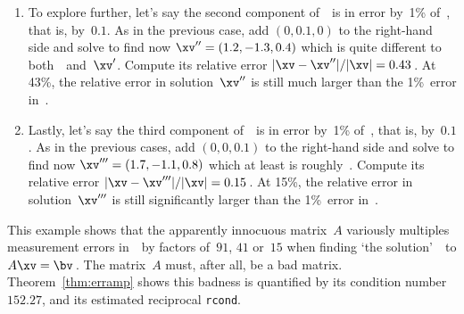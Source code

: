 \begin{example}
\begin{enumerate}
\item To explore further, let's say the second component of~\bv\ is in error by~1\% of~\bv, that is, by~\(0.1\).
As in the previous case, add \((0,0.1,0)\) to the right-hand side and solve to find now \(\xv''=(1.2,-1.3,0.4)\) which is quite different to both~\xv\ and~\(\xv'\).
Compute its relative error \(|\xv-\xv''|/|\xv|=0.43\)\,.
At 43\%, the relative error in solution~\(\xv''\) is still much larger than the 1\%~error in~\bv.

\item Lastly, let's say the third component of~\bv\ is in error by~1\% of~\bv, that is, by~\(0.1\).
As in the previous cases, add \((0,0,0.1)\) to the right-hand side and solve to find now \(\xv'''=(1.7,-1.1,0.8)\) which at least is roughly~\xv.
Compute its relative error \(|\xv-\xv'''|/|\xv|=0.15\)\,.
At 15\%, the relative error in solution~\(\xv'''\) is still significantly larger than the 1\%~error in~\bv.

\end{enumerate}
This example shows that the apparently innocuous matrix~\(A\) variously multiples measurement errors in~\bv\ by factors of~\(91\), \(41\) or~\(15\) when finding `the solution'~\xv\ to \(A\xv=\bv\)\,.
The matrix~\(A\) must, after all, be a bad matrix.
Theorem~\ref{thm:erramp} shows this badness is quantified by its  condition number~\(152.27\), and its estimated reciprocal \verb|rcond|. 
\end{example}




